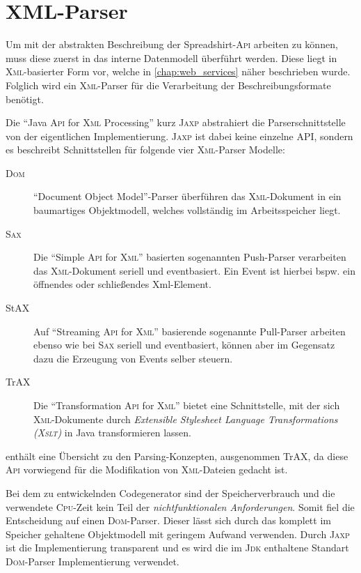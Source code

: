 \section{XML-Parser}
\label{sec:xml_parser}

Um mit der abstrakten Beschreibung der Spreadshirt-\textsc{Api} arbeiten zu können, muss diese zuerst in das interne Datenmodell überführt werden. Diese liegt in \textsc{Xml}-basierter Form vor, welche in \cref{chap:web_services} näher beschrieben wurde. Folglich wird ein \textsc{Xml}-Parser für die Verarbeitung der Beschreibungsformate benötigt.  

Die \enquote{Java \textsc{Api} for \textsc{Xml} Processing} kurz \textsc{Jaxp} abstrahiert die Parserschnittstelle von der eigentlichen Implementierung. \textsc{Jaxp} ist dabei keine einzelne \gls{API}, sondern es beschreibt Schnittstellen für folgende vier \textsc{Xml}-Parser Modelle:

\begin{description}
    \item[\textsc{Dom}] \enquote{Document Object Model}-Parser überführen das \textsc{Xml}-Dokument in ein baumartiges Objektmodell, welches vollständig im Arbeitsspeicher liegt.
    \item[\textsc{Sax}] Die \enquote{Simple \textsc{Api} for \textsc{Xml}} basierten sogenannten Push-Parser verarbeiten das \textsc{Xml}-Dokument seriell und eventbasiert. Ein Event ist hierbei bspw. ein öffnendes oder schließendes Xml-Element.
    \item[StAX] Auf \enquote{Streaming \textsc{Api} for \textsc{Xml}} basierende sogenannte Pull-Parser arbeiten ebenso wie bei \textsc{Sax} seriell und eventbasiert, können aber im Gegensatz dazu die Erzeugung von Events selber steuern. 
    \item[TrAX] Die \enquote{Transformation \textsc{Api} for \textsc{Xml}} bietet eine Schnittstelle, mit der sich \textsc{Xml}-Dokumente durch \emph{Extensible Stylesheet Language Transformations (\textsc{Xslt})} in Java transformieren lassen.
\end{description}

 enthält eine Übersicht zu den Parsing-Konzepten, ausgenommen TrAX, da diese \textsc{Api} vorwiegend für die Modifikation von \textsc{Xml}-Dateien gedacht ist.

Bei dem zu entwickelnden Codegenerator sind der Speicherverbrauch und die verwendete \textsc{Cpu}-Zeit kein Teil der \emph{nichtfunktionalen Anforderungen}. Somit fiel die Entscheidung auf einen \textsc{Dom}-Parser. Dieser lässt sich durch das komplett im Speicher gehaltene Objektmodell mit geringem Aufwand verwenden. Durch \textsc{Jaxp} ist die Implementierung transparent und es wird die im \textsc{Jdk} enthaltene Standart \textsc{Dom}-Parser Implementierung verwendet.


